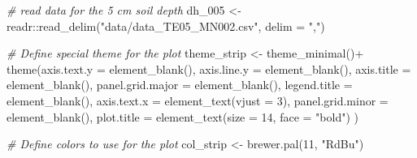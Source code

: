 \documentclass[
]{article}
\newenvironment{Shaded}{\begin{snugshade}}{\end{snugshade}}
\newcommand{\AttributeTok}[1]{\textcolor[rgb]{0.77,0.63,0.00}{#1}}
\newcommand{\CommentTok}[1]{\textcolor[rgb]{0.56,0.35,0.01}{\textit{#1}}}
\newcommand{\DecValTok}[1]{\textcolor[rgb]{0.00,0.00,0.81}{#1}}
\newcommand{\FunctionTok}[1]{\textcolor[rgb]{0.00,0.00,0.00}{#1}}
\newcommand{\NormalTok}[1]{#1}
\newcommand{\OtherTok}[1]{\textcolor[rgb]{0.56,0.35,0.01}{#1}}
\newcommand{\SpecialCharTok}[1]{\textcolor[rgb]{0.00,0.00,0.00}{#1}}
\newcommand{\StringTok}[1]{\textcolor[rgb]{0.31,0.60,0.02}{#1}}
\begin{document}
\begin{Shaded}
\begin{Highlighting}[]
\CommentTok{\# read data for the 5 cm soil depth}
\NormalTok{dh\_005 }\OtherTok{\textless{}{-}}\NormalTok{ readr}\SpecialCharTok{::}\FunctionTok{read\_delim}\NormalTok{(}\StringTok{"data/data\_TE05\_MN002.csv"}\NormalTok{, }\AttributeTok{delim =} \StringTok{","}\NormalTok{)}

\CommentTok{\# Define special theme for the plot}
\NormalTok{theme\_strip }\OtherTok{\textless{}{-}} \FunctionTok{theme\_minimal}\NormalTok{()}\SpecialCharTok{+}
                 \FunctionTok{theme}\NormalTok{(}\AttributeTok{axis.text.y =} \FunctionTok{element\_blank}\NormalTok{(),}
                       \AttributeTok{axis.line.y =} \FunctionTok{element\_blank}\NormalTok{(),}
                       \AttributeTok{axis.title =} \FunctionTok{element\_blank}\NormalTok{(),}
                       \AttributeTok{panel.grid.major =} \FunctionTok{element\_blank}\NormalTok{(),}
                       \AttributeTok{legend.title =} \FunctionTok{element\_blank}\NormalTok{(),}
                       \AttributeTok{axis.text.x =} \FunctionTok{element\_text}\NormalTok{(}\AttributeTok{vjust =} \DecValTok{3}\NormalTok{),}
                       \AttributeTok{panel.grid.minor =} \FunctionTok{element\_blank}\NormalTok{(),}
                        \AttributeTok{plot.title =} \FunctionTok{element\_text}\NormalTok{(}\AttributeTok{size =} \DecValTok{14}\NormalTok{, }\AttributeTok{face =} \StringTok{"bold"}\NormalTok{)}
\NormalTok{                       )}

\CommentTok{\# Define colors to use for the plot}
\NormalTok{col\_strip }\OtherTok{\textless{}{-}} \FunctionTok{brewer.pal}\NormalTok{(}\DecValTok{11}\NormalTok{, }\StringTok{"RdBu"}\NormalTok{)}


\end{Highlighting}
\end{Shaded}
\end{document}
